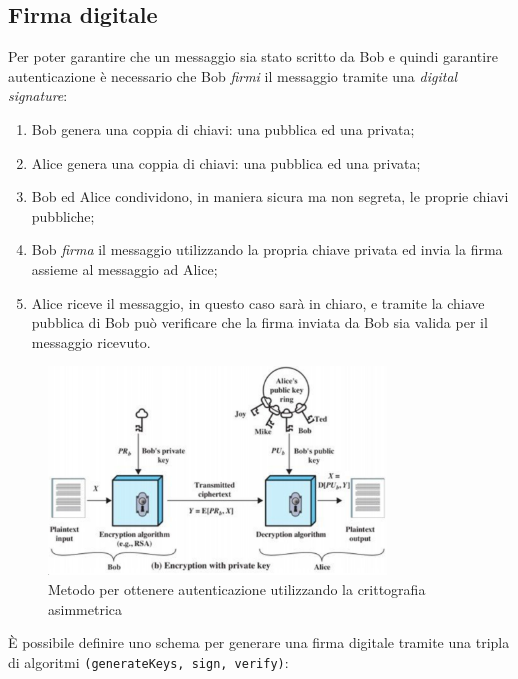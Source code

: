 \subsection{Firma digitale}
Per poter garantire che un messaggio sia stato scritto da Bob e quindi garantire autenticazione è necessario che Bob \textit{firmi} il messaggio tramite una \textit{digital signature}:
\begin{enumerate}
    \item Bob genera una coppia di chiavi: una pubblica ed una privata;
    \item Alice genera una coppia di chiavi: una pubblica ed una privata;
    \item Bob ed Alice condividono, in maniera sicura ma non segreta, le proprie chiavi pubbliche;
    \item Bob \textit{firma} il messaggio utilizzando la propria chiave privata ed invia la firma assieme al messaggio ad Alice;
    \item Alice riceve il messaggio, in questo caso sarà in chiaro, e tramite la chiave pubblica di Bob può verificare che la firma inviata da Bob sia valida per il messaggio ricevuto.
\end{enumerate}
\begin{figure}[H]
    \centering
    \includegraphics[width=0.8\textwidth]{images/authentication.png}
    \caption{Metodo per ottenere autenticazione utilizzando la crittografia asimmetrica}
\end{figure}
È possibile definire uno schema per generare una firma digitale tramite una tripla di algoritmi \texttt{(generateKeys, sign, verify)}:

